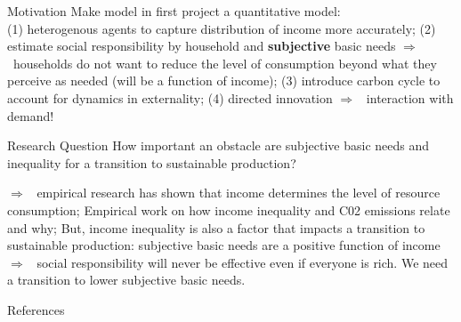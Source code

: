 \documentclass[11pt,aspectratio=169]{beamer}
\newcommand{\ar}{$\Rightarrow$ \ }
\begin{document}
\begin{frame}{Motivation}
	Make model in first project a quantitative model:\\ (1) heterogenous agents to capture distribution of income more accurately;  (2) estimate social responsibility by household and \textbf{subjective} basic needs \ar households do not want to reduce the level of consumption beyond what they perceive as needed (will be a function of income);  (3) introduce carbon cycle to account for dynamics in externality; (4) directed innovation \ar interaction with demand!  \\
	
	\begin{block}{Research Question}
How important an obstacle are subjective basic needs and inequality for a transition to sustainable production?
\end{block}
	\ar empirical research has shown that income determines the level of resource consumption; Empirical work on how income inequality and C02 emissions relate and why; But, income inequality is also a factor that impacts a transition to sustainable production: subjective basic needs are a positive function of income \ar social responsibility will never be effective even if everyone is rich. We need a transition to lower subjective basic needs. 
	
	
\end{frame}


\begin{frame}[shrink]{References}
	
	
	
\end{frame}
\end{document}
